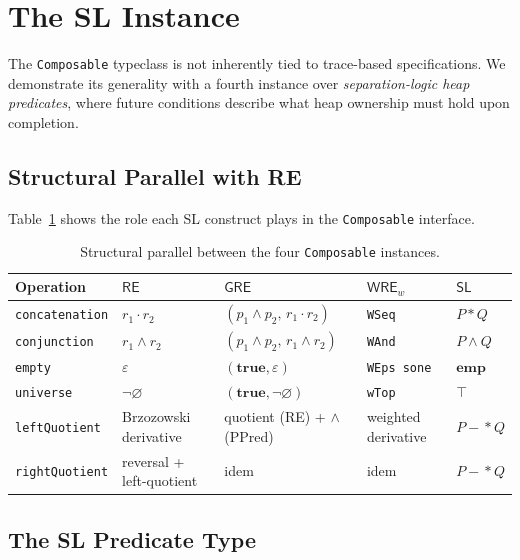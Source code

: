 \documentclass[acmsmall,screen]{acmart}
\newcommand{\RE}{\mathsf{RE}}
\newcommand{\GRE}{\mathsf{GRE}}
\newcommand{\WRE}{\mathsf{WRE}}
\newcommand{\SL}{\mathsf{SL}}
\newcommand{\sep}{*}
\newcommand{\wand}{-\!\!*}
\newcommand{\univ}{\neg\varnothing}
\begin{document}
\section{The SL Instance}
\label{sec:sl-instance}

The \lstinline{Composable} typeclass is not inherently tied to trace-based
specifications.
We demonstrate its generality with a fourth instance over
\emph{separation-logic heap predicates}, where future conditions describe
what heap ownership must hold upon completion.

\subsection{Structural Parallel with RE}

Table~\ref{tab:sl-re-parallel} shows the role each SL construct plays
in the \lstinline{Composable} interface.

\begin{table}[ht]
\caption{Structural parallel between the four \lstinline{Composable} instances.}
\label{tab:sl-re-parallel}
\begin{tabular}{lllll}
\toprule
Operation & $\RE$ & $\GRE$ & $\WRE_w$ & $\SL$ \\
\midrule
\lstinline{concatenation} & $r_1 \cdot r_2$ & $(p_1\wedge p_2,\,r_1\cdot r_2)$ & \lstinline{WSeq} & $P \sep Q$ \\
\lstinline{conjunction}   & $r_1 \wedge r_2$ & $(p_1\wedge p_2,\,r_1\wedge r_2)$ & \lstinline{WAnd} & $P \wedge Q$ \\
\lstinline{empty}         & $\varepsilon$ & $(\mathbf{true},\varepsilon)$ & \lstinline{WEps sone} & $\mathbf{emp}$ \\
\lstinline{universe}      & $\univ$ & $(\mathbf{true},\univ)$ & \lstinline{wTop} & $\top$ \\
\lstinline{leftQuotient}  & Brzozowski derivative & quotient (RE) + $\wedge$ (PPred) & weighted derivative & $P \wand Q$ \\
\lstinline{rightQuotient} & reversal + left-quotient & idem & idem & $P \wand Q$ \\
\bottomrule
\end{tabular}
\end{table}

\subsection{The SL Predicate Type}
\end{document}
